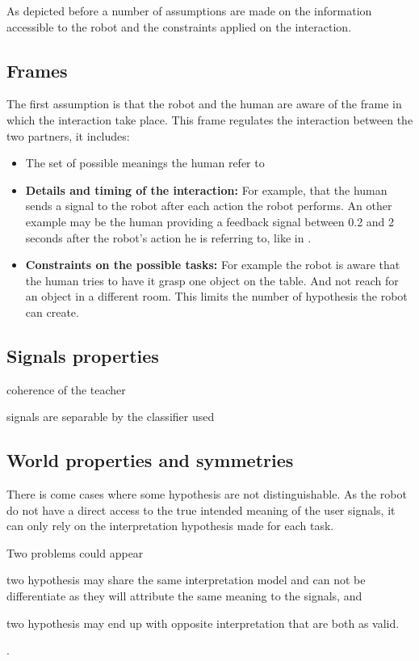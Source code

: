 As depicted before a number of assumptions are made on the information accessible to the robot and the constraints applied on the interaction.

\subsection{Frames}

The first assumption is that the robot and the human are aware of the frame in which the interaction take place. This frame regulates the interaction between the two partners, it includes:

\begin{itemize}

\item The set of possible meanings the human refer to 

\item \textbf{Details and timing of the interaction:} For example, that the human sends a signal to the robot after each action the robot performs. An other example may be the human providing a feedback signal between 0.2 and 2 seconds after the robot's action he is referring to, like in \cite{knox2009interactively}.

\item \textbf{Constraints on the possible tasks:} For example the robot is aware that the human tries to have it grasp one object on the table. And not reach for an object in a different room. This limits the number of hypothesis the robot can create.

\end{itemize}

\subsection{Signals properties}

coherence of the teacher

signals are separable by the classifier used

\subsection{World properties and symmetries}

There is come cases where some hypothesis are not distinguishable. As the robot do not have a direct access to the true intended meaning of the user signals, it can only rely on the interpretation hypothesis made for each task.

Two problems could appear \begin{inparaenum}[a)] \item two hypothesis may share the same interpretation model and can not be differentiate as they will attribute the same meaning to the signals, and \item two hypothesis may end up with opposite interpretation that are both as valid. \end{inparaenum}.

